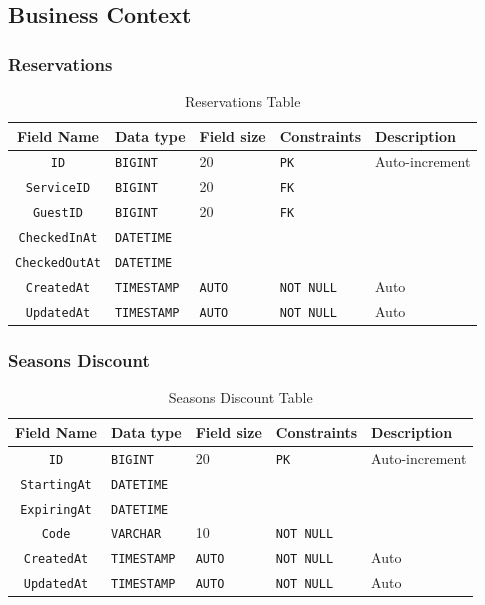 \subsection{Business Context}

\subsubsection{Reservations}

\begin{table}[H]
	\centering
	\begin{tabular}{cllll}
		\hline
		Field Name & Data type & Field size & Constraints & Description \\ \hline
		\texttt{ID} & \texttt{BIGINT} & 20 & \texttt{PK} & Auto-increment \\
		\texttt{ServiceID} & \texttt{BIGINT} & 20 & \texttt{FK} &  \\
		\texttt{GuestID} & \texttt{BIGINT} & 20 & \texttt{FK} &  \\
		\texttt{CheckedInAt} & \texttt{DATETIME} & & &  \\
		\texttt{CheckedOutAt} & \texttt{DATETIME} & & &  \\
		
		\texttt{CreatedAt} & \texttt{TIMESTAMP} & \texttt{AUTO} & \texttt{NOT NULL} & Auto \\
		\texttt{UpdatedAt} & \texttt{TIMESTAMP} & \texttt{AUTO} & \texttt{NOT NULL} & Auto \\
		\hline
	\end{tabular}
	\caption{Reservations Table}
\end{table}

\subsubsection{Seasons Discount}

\begin{table}[H]
	\centering
	\begin{tabular}{cllll}
		\hline
		Field Name & Data type & Field size & Constraints & Description \\ \hline
		\texttt{ID} & \texttt{BIGINT} & 20 & \texttt{PK} & Auto-increment \\
		\texttt{StartingAt} & \texttt{DATETIME} & & &  \\
		\texttt{ExpiringAt} & \texttt{DATETIME} & & &  \\
		\texttt{Code} & \texttt{VARCHAR} & 10 & \texttt{NOT NULL} &  \\
		
		\texttt{CreatedAt} & \texttt{TIMESTAMP} & \texttt{AUTO} & \texttt{NOT NULL} & Auto \\
		\texttt{UpdatedAt} & \texttt{TIMESTAMP} & \texttt{AUTO} & \texttt{NOT NULL} & Auto \\
		\hline
	\end{tabular}
	\caption{Seasons Discount Table}
\end{table}

